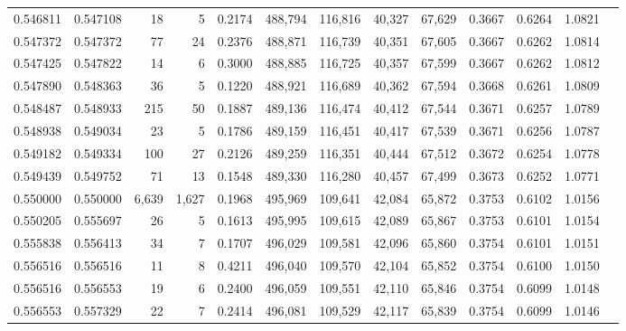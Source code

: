 \begin{tabular}{rrrrrrrrrrrrr}
0.546811 & 0.547108 &     18 &     5 &                                     0.2174 & 488,794 & 116,816 &  40,327 &  67,629 & 0.3667 & 0.6264 & 1.0821 \\
0.547372 & 0.547372 &     77 &    24 &                                     0.2376 & 488,871 & 116,739 &  40,351 &  67,605 & 0.3667 & 0.6262 & 1.0814 \\
0.547425 & 0.547822 &     14 &     6 &                                     0.3000 & 488,885 & 116,725 &  40,357 &  67,599 & 0.3667 & 0.6262 & 1.0812 \\
0.547890 & 0.548363 &     36 &     5 &                                     0.1220 & 488,921 & 116,689 &  40,362 &  67,594 & 0.3668 & 0.6261 & 1.0809 \\
0.548487 & 0.548933 &    215 &    50 &                                     0.1887 & 489,136 & 116,474 &  40,412 &  67,544 & 0.3671 & 0.6257 & 1.0789 \\
0.548938 & 0.549034 &     23 &     5 &                                     0.1786 & 489,159 & 116,451 &  40,417 &  67,539 & 0.3671 & 0.6256 & 1.0787 \\
0.549182 & 0.549334 &    100 &    27 &                                     0.2126 & 489,259 & 116,351 &  40,444 &  67,512 & 0.3672 & 0.6254 & 1.0778 \\
0.549439 & 0.549752 &     71 &    13 &                                     0.1548 & 489,330 & 116,280 &  40,457 &  67,499 & 0.3673 & 0.6252 & 1.0771 \\
0.550000 & 0.550000 &  6,639 & 1,627 &                                     0.1968 & 495,969 & 109,641 &  42,084 &  65,872 & 0.3753 & 0.6102 & 1.0156 \\
0.550205 & 0.555697 &     26 &     5 &                                     0.1613 & 495,995 & 109,615 &  42,089 &  65,867 & 0.3753 & 0.6101 & 1.0154 \\
0.555838 & 0.556413 &     34 &     7 &                                     0.1707 & 496,029 & 109,581 &  42,096 &  65,860 & 0.3754 & 0.6101 & 1.0151 \\
0.556516 & 0.556516 &     11 &     8 &                                     0.4211 & 496,040 & 109,570 &  42,104 &  65,852 & 0.3754 & 0.6100 & 1.0150 \\
0.556516 & 0.556553 &     19 &     6 &                                     0.2400 & 496,059 & 109,551 &  42,110 &  65,846 & 0.3754 & 0.6099 & 1.0148 \\
0.556553 & 0.557329 &     22 &     7 &                                     0.2414 & 496,081 & 109,529 &  42,117 &  65,839 & 0.3754 & 0.6099 & 1.0146 \\

\end{tabular}
